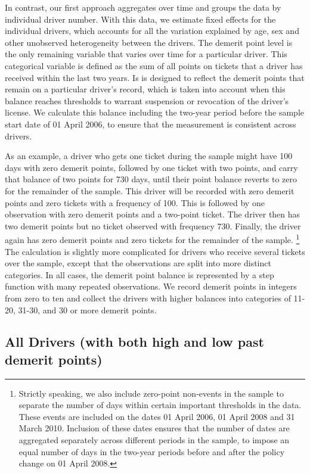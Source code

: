 \documentclass[12pt]{paper}
\begin{document}
In contrast, our first approach aggregates over time and groups the data by individual driver number. 
With this data, we estimate fixed effects for the individual drivers, which accounts for all the variation explained by age, sex and other unobserved heterogeneity between the drivers.
The demerit point level is the only remaining variable that varies over time for a particular driver. 
% 
This categorical variable is defined as the sum of all points on tickets that a driver has received within the last two years. 
Is is designed to reflect the demerit points that remain on a particular driver's record, 
which is taken into account when this balance reaches thresholds to warrant suspension or revocation of the driver's license. 
We calculate this balance including the two-year period before the sample start date of 01 April 2006, to ensure that the measurement is consistent across drivers. 

As an example, a driver who gets one ticket during the sample might have 100 days with zero 
demerit points, followed by one ticket with two points, and carry that balance of two points for 730 days, until their point balance reverts to zero for the remainder of the sample. 
This driver will be recorded with zero demerit points and zero tickets with a frequency of 100. 
This is followed by one observation with zero demerit points and a two-point ticket. 
The driver then has two demerit points but no ticket observed with frequency 730. 
Finally, the driver again has zero demerit points and zero tickets for the remainder of the sample.%
\footnote{Strictly speaking, we also include zero-point non-events in the sample
to separate the number of days within certain important thresholds in the data. 
These events are included on the dates 01 April 2006, 01 April 2008 and 31 March 2010. 
Inclusion of these dates ensures that the number of dates are aggregated separately across 
different periods in the sample, to impose an equal number of days in the two-year periods before and after the policy change on 01 April 2008. }
The calculation is slightly more complicated for drivers who receive several tickets over the sample, 
except that the observations are split into more distinct categories. 
In all cases, the demerit point balance is represented by a step function with many repeated observations. 
We record demerit points in integers from zero to ten and collect the drivers with higher balances
into categories of 11-20, 31-30, and 30 or more demerit points. 


\subsection*{All Drivers (with both high and low past demerit points)}
\end{document}
